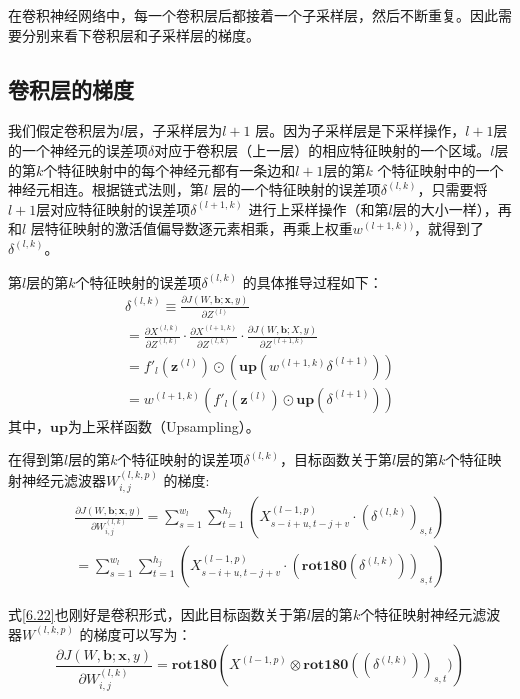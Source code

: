 \documentclass[11pt,fleqn, UTF8]{ctexbook} %
\begin{document}
在卷积神经网络中，每一个卷积层后都接着一个子采样层，然后不断重复。因此需要分别来看下卷积层和子采样层的梯度。
\subsection{卷积层的梯度}
我们假定卷积层为$l$层，子采样层为$l + 1$ 层。因为子采样层是下采样操作，$l + 1$层的一个神经元的误差项$\delta$对应于卷积层（上一层）的相应特征映射的一个区域。$l$层的第$k$个特征映射中的每个神经元都有一条边和$l + 1$层的第$k$ 个特征映射中的一个神经元相连。根据链式法则，第$l$ 层的一个特征映射的误差项$\delta^{(l,k)}$，只需要将$l + 1$层对应特征映射的误差项$\delta^{(l+1,k)}$ 进行上采样操作（和第$l$层的大小一样），再和$l$ 层特征映射的激活值偏导数逐元素相乘，再乘上权重$w^{(l+1,k))}$，就得到了$\delta^{(l,k)}$。

第$l$层的第$k$个特征映射的误差项$\delta^{(l,k)}$ 的具体推导过程如下：
\begin{gather}\label{6.18}
  \delta^{(l,k)} \equiv \frac{\partial J(W,\boldsymbol{b};\boldsymbol{x},y)}{\partial Z^{(l)}}\\
  =\frac{\partial X^{(l,k)}}{\partial Z^{(l,k)}}\cdot \frac{\partial X^{(l+1,k)}}{\partial Z^{(l,k)}}\cdot\frac{\partial J(W,\boldsymbol{b};X,y)}{\partial Z^{(l+1,k)}}\\
  =f'_l(\boldsymbol{z}^{(l)})\odot \left( \boldsymbol{up}(w^{(l+1,k)}\delta^{(l+1)}) \right)\\
  =w^{(l+1,k)}\left( f'_l(\boldsymbol{z}^{(l)}) \odot \boldsymbol{up}(\delta^{(l+1)}) \right)
\end{gather}
其中，$\boldsymbol{up}$为上采样函数（Upsampling）。

在得到第$l$层的第$k$个特征映射的误差项$\delta^{(l,k)}$，目标函数关于第$l$层的第$k$个特征映射神经元滤波器$W_{i,j}^{(l,k,p)}$ 的梯度:
\begin{gather}\label{6.22}
  \frac{\partial J(W,\boldsymbol{b};\boldsymbol{x},y)}{\partial W_{i,j}^{(l,k)}} = \sum_{s=1}^{w_l}\sum_{t=1}^{h_j} \left( X_{s-i+u,t-j+v}^{(l-1,p)}\cdot(\delta^{(l,k)})_{s,t}\right)\\
  =\sum_{s=1}^{w_l}\sum_{t=1}^{h_j} \left( X_{s-i+u,t-j+v}^{(l-1,p)}\cdot(\boldsymbol{rot180}(\delta^{(l,k)}))_{s,t}\right)
\end{gather}

式\ref{6.22}也刚好是卷积形式，因此目标函数关于第$l$层的第$k$个特征映射神经元滤波器$W^{(l,k,p)}$ 的梯度可以写为：
\begin{equation}\label{6.24}
  \frac{\partial J(W,\boldsymbol{b};\boldsymbol{x},y)}{\partial W_{i,j}^{(l,k)}}=\boldsymbol{rot180}\left(  X^{(l-1,p)}\otimes \boldsymbol{rot180}((\delta^{(l,k)}))_{s,t}) \right)
\end{equation}
\end{document}
